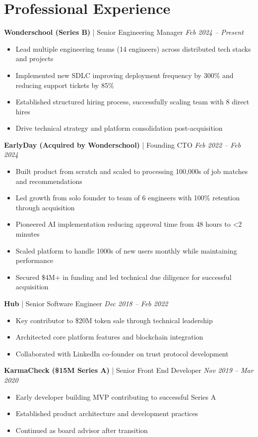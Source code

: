\documentclass[letterpaper,10pt]{article}
\begin{document}
\section*{Professional Experience}

\textbf{Wonderschool (Series B)} | Senior Engineering Manager \hfill \textit{Feb 2024 -- Present}
\begin{itemize}[leftmargin=*, nosep]
    \item Lead multiple engineering teams (14 engineers) across distributed tech stacks and projects
    \item Implemented new SDLC improving deployment frequency by 300\% and reducing support tickets by 85\%
    \item Established structured hiring process, successfully scaling team with 8 direct hires
    \item Drive technical strategy and platform consolidation post-acquisition
\end{itemize}

\textbf{EarlyDay (Acquired by Wonderschool)} | Founding CTO \hfill \textit{Feb 2022 -- Feb 2024}
\begin{itemize}[leftmargin=*, nosep]
    \item Built product from scratch and scaled to processing 100,000s of job matches and recommendations
    \item Led growth from solo founder to team of 6 engineers with 100\% retention through acquisition
    \item Pioneered AI implementation reducing approval time from 48 hours to <2 minutes
    \item Scaled platform to handle 1000s of new users monthly while maintaining performance
    \item Secured \$4M+ in funding and led technical due diligence for successful acquisition
\end{itemize}
\textbf{Hub} | Senior Software Engineer \hfill \textit{Dec 2018 -- Feb 2022}
\begin{itemize}[leftmargin=*, nosep]
    \item Key contributor to \$20M token sale through technical leadership
    \item Architected core platform features and blockchain integration
    \item Collaborated with LinkedIn co-founder on trust protocol development
\end{itemize}

\textbf{KarmaCheck (\$15M Series A)} | Senior Front End Developer \hfill \textit{Nov 2019 -- Mar 2020}
\begin{itemize}[leftmargin=*, nosep]
    \item Early developer building MVP contributing to successful Series A
    \item Established product architecture and development practices
    \item Continued as board advisor after transition
\end{itemize}
\end{document}
